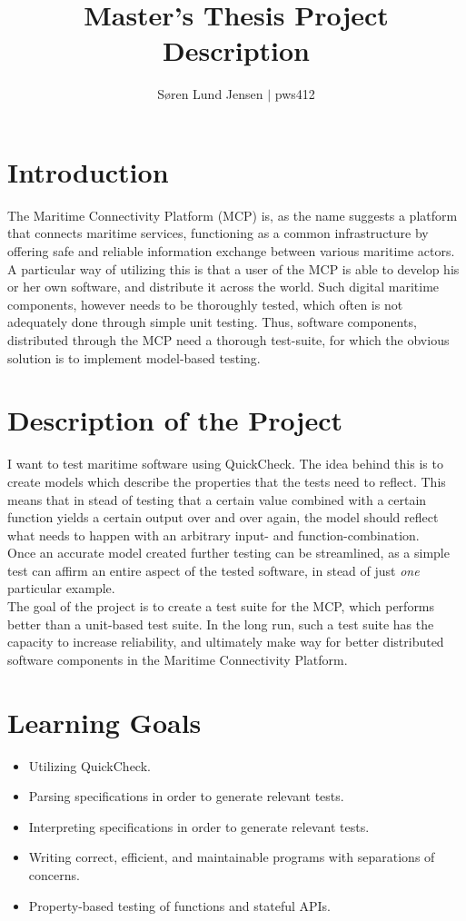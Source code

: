 \documentclass[a4paper]{article}
\title{Master's Thesis Project Description}
\author{Søren Lund Jensen $|$ pws412}
\newcommand{\tit}[1]{\textit{#1}}
\newcommand{\smallSep}{0.3cm}
\begin{document}
\maketitle
\section*{Introduction}
The Maritime Connectivity Platform \cite{mcp} (MCP) is, as the name suggests a platform that connects maritime services, functioning as a common infrastructure by offering safe and reliable information exchange between various maritime actors. A particular way of utilizing this is that a user of the MCP is able to develop his or her own software, and distribute it across the world. Such digital maritime components, however needs to be thoroughly tested, which often is not adequately done through simple unit testing. Thus, software components, distributed through the MCP need a thorough test-suite, for which the obvious solution is to implement model-based testing.
\section*{Description of the Project}
I want to test maritime software using QuickCheck. The idea behind this is to create models which describe the properties that the tests need to reflect. This means that in stead of testing that a certain value combined with a certain function yields a certain output over and over again, the model should reflect what needs to happen with an arbitrary input- and function-combination. \\[\smallSep]
Once an accurate model created further testing can be streamlined, as a simple test can affirm an entire aspect of the tested software, in stead of just \tit{one} particular example.\\[\smallSep]
The goal of the project is to create a test suite for the MCP, which performs better than a unit-based test suite. In the long run, such a test suite has the capacity to increase reliability, and ultimately make way for better distributed software components in the Maritime Connectivity Platform. 
\section*{Learning Goals}
\begin{itemize}
	\item Utilizing QuickCheck.
	\item Parsing specifications in order to generate relevant tests.
	\item Interpreting specifications in order to generate relevant tests.
	\item Writing correct, efficient, and maintainable programs with separations of concerns.
	\item Property-based testing of functions and stateful APIs.
\end{itemize}
\end{document}
